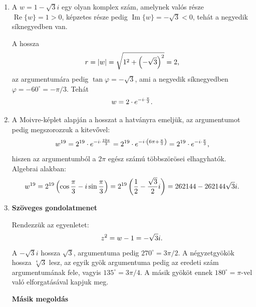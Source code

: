 \documentclass[11pt]{scrartcl}
\begin{document}
\begin{enumerate}
	\item A $w = 1 - \sqrt{3} i$ egy olyan komplex szám, amelynek valós része
	      $\operatorname{Re} \{w\} = 1 > 0$, képzetes része pedig
	      $\operatorname{Im} \{w\} = -\sqrt{3} < 0$, tehát a negyedik
	      síknegyedben van.

	      A hossza
	      \[
		      r = |w| = \sqrt{1^2 + \left(-\sqrt{3}\right)^2} = 2
		      \text,
	      \]
	      az argumentumára pedig $\tan \varphi = -\sqrt{3}$, ami a
	      negyedik síknegyedben $\varphi = -60^\circ = -\pi / 3$. Tehát
	      \[
		      w = 2 \cdot e^{-i \cdot \frac{\pi}{3}}
		      \text.
	      \]

	\item A Moivre-képlet alapján a hosszat a hatványra emeljük, az
	      argumentumot pedig megszorozzuk a kitevővel:
	      \[
		      w^{19}
		      = 2^{19} \cdot e^{-i \cdot \frac{19\pi}{3}}
		      = 2^{19} \cdot e^{-i \cdot \left(6\pi + \frac{\pi}{3}\right)}
		      = 2^{19} \cdot e^{-i \cdot \frac{\pi}{3}}
		      \text,
	      \]
	      hiszen az argumentumból a $2\pi$ egész számú többszörösei
	      elhagyhatók. Algebrai alakban:
	      \[
		      w^{19}
		      = 2^{19} \left( \cos \frac{\pi}{3} - i \sin \frac{\pi}{3} \right)
		      = 2^{19} \left( \frac{1}{2} - \frac{\sqrt{3}}{2} i \right)
		      = 262144 - 262144\sqrt{3} i
		      \text.
	      \]

	\item \textbf{Szöveges gondolatmenet}

	      Rendezzük az egyenletet:
	      \[
		      z^2 = w - 1 = -\sqrt{3} i
		      \text.
	      \]
	      A $-\sqrt{3} i$ hossza $\sqrt{3}$, argumentuma pedig
	      $270^\circ = 3\pi / 2$. A négyzetgyökök hossza $\sqrt[4]{3}$ lesz, az
	      egyik gyök argumentuma pedig az eredeti szám argumentumának fele,
	      vagyis $135^\circ = 3\pi / 4$. A másik gyököt ennek
	      $180^\circ = \pi$-vel való elforgatásával kapjuk meg.

	      \textbf{Másik megoldás}


\end{enumerate}
\end{document}
